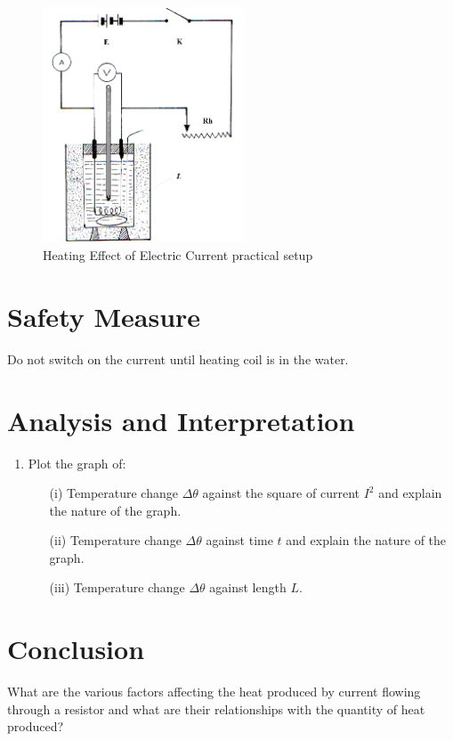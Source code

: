 \begin{figure}[h!]
\centering
\includegraphics[width=6cm]{./img/heating-effect-current-1.png}
\caption{Heating Effect of Electric Current practical setup}
\label{fig:heating-effect-current-1}
\end{figure}

\section{Safety Measure}
Do not switch on the current until heating coil is in the water.

\section{Analysis and Interpretation}
\begin{enumerate}
\item Plot the graph of:
\begin{itemize}
\item[(i)] Temperature change $\Delta \theta$ against the square of current $I^2$ and explain the nature of the graph.
\item[(ii)]	Temperature change $\Delta \theta$ against time $t$ and explain the nature of the graph.
\item[(iii)] Temperature change $\Delta \theta$ against length $L$.
\end{itemize}
\end{enumerate}

\section{Conclusion}
What are the various factors affecting the heat produced by current flowing through a resistor and what are their relationships with the quantity of heat produced?

